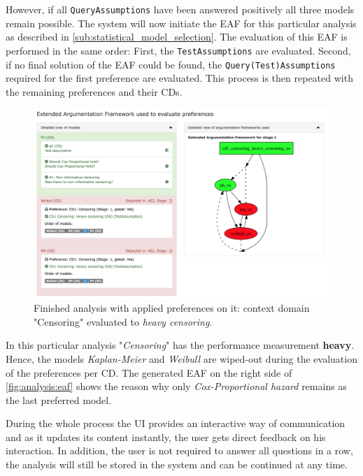 However, if all \texttt{QueryAssumptions} have been answered positively all three models remain possible. The system will now initiate the \gls{EAF} for this particular analysis as described in \autoref{sub:statistical_model_selection}. The evaluation of this \gls{EAF} is performed in the same order: First, the \texttt{TestAssumptions} are evaluated. Second, if no final solution of the \gls{EAF} could be found, the \texttt{Query(Test)Assumptions} required for the first preference are evaluated. This process is then repeated with the remaining preferences and their \glspl{CD}.

\begin{figure}[t]
	\centering
	\includegraphics[width=\textwidth]{figures/ui_analysis_eaf}
	\caption{Finished analysis with applied preferences on it: context domain "Censoring" evaluated to \textit{heavy censoring}. }
	\label{fig:analysis:eaf}
\end{figure}


In this particular analysis "\textit{Censoring}" has the performance measurement \textbf{heavy}. Hence, the models \textit{Kaplan-Meier} and \textit{Weibull} are wiped-out during the evaluation of the preferences per \gls{CD}. The generated \gls{EAF} on the right side of \autoref{fig:analysis:eaf} shows the reason why only \textit{Cox-Proportional hazard} remains as the last preferred model.


During the whole process the \gls{UI} provides an interactive way of communication and as it updates its content instantly, the user gets direct feedback on his interaction. In addition, the user is not required to answer all questions in a row, the analysis will still be stored in the system and can be continued at any time. 